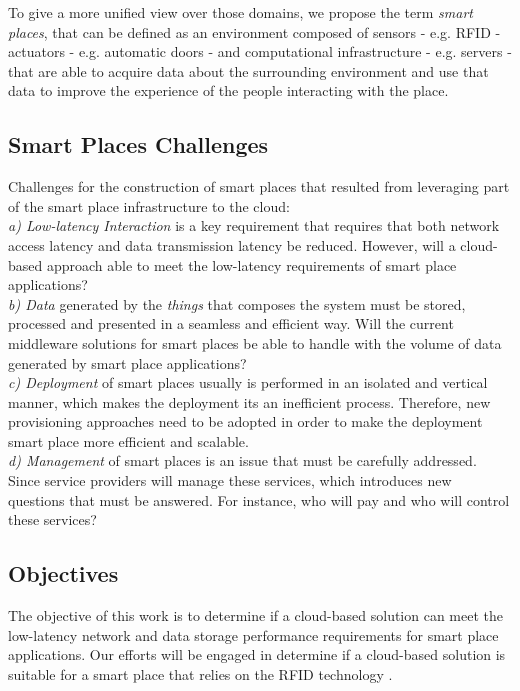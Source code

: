 To give a more unified view over those domains, we propose the term \textit{smart places},
that can be defined as an environment composed of sensors - e.g. RFID - actuators - e.g. automatic
doors - and computational infrastructure - e.g. servers - that are able to acquire data about the
surrounding environment and use that data to improve the experience of the people interacting with
the place.

\subsection{Smart Places Challenges}
\label{substion:challenges}
Challenges \cite{caceres2012ubicomp} for the construction of smart places that resulted from leveraging
part of the smart place infrastructure to the cloud:\\

\textit{a) Low-latency Interaction} is a key requirement that requires that both network access
latency and data transmission latency be reduced. However, will a cloud-based
approach able to meet the low-latency requirements of smart place applications?\\

\textit{b) Data} generated by the \textit{things} that composes the system must be stored, processed
and presented in a seamless and efficient way. Will the current middleware solutions for smart places
\cite{floerkemeier2007rfid}\cite{eisenhauer2010hydra}\cite{de2008socrades} be able to handle with
the volume of data generated by smart place applications?\\

\textit{c) Deployment} of smart places usually is performed in an isolated and vertical manner, which
makes the deployment its an inefficient process. Therefore, new provisioning approaches need to be
adopted in order to make the deployment smart place more efficient and scalable.\\

\textit{d) Management} of smart places is an issue that must be carefully addressed. Since
service providers will manage these services, which introduces new questions that must be
answered. For instance, who will pay and who will control these services?

\subsection{Objectives}
\label{subs:objectives}
The objective of this work is to determine if a cloud-based solution can meet the low-latency network
and data storage performance requirements for smart place applications. Our efforts will be engaged in
determine if a cloud-based solution is suitable for a smart place that relies on the RFID technology
\cite{want2006introduction}.\\

